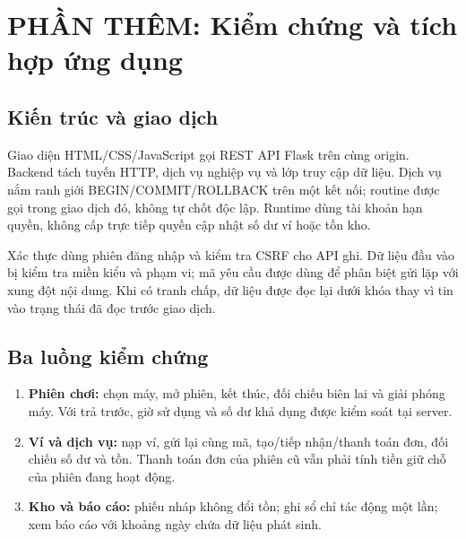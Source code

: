 \chapter{PHẦN THÊM: Kiểm chứng và tích hợp ứng dụng}\label{chap:verification}
\section{Kiến trúc và giao dịch}
Giao diện HTML/CSS/JavaScript gọi REST API Flask trên cùng origin. Backend tách tuyến HTTP, dịch vụ nghiệp vụ và lớp truy cập dữ liệu. Dịch vụ nắm ranh giới BEGIN/COMMIT/ROLLBACK trên một kết nối; routine được gọi trong giao dịch đó, không tự chốt độc lập. Runtime dùng tài khoản hạn quyền, không cấp trực tiếp quyền cập nhật số dư ví hoặc tồn kho.


Xác thực dùng phiên đăng nhập và kiểm tra CSRF cho API ghi. Dữ liệu đầu vào bị kiểm tra miền kiểu và phạm vi; mã yêu cầu được dùng để phân biệt gửi lặp với xung đột nội dung. Khi có tranh chấp, dữ liệu được đọc lại dưới khóa thay vì tin vào trạng thái đã đọc trước giao dịch.
\section{Ba luồng kiểm chứng}
\begin{enumerate}
\item \textbf{Phiên chơi:} chọn máy, mở phiên, kết thúc, đối chiếu biên lai và giải phóng máy. Với trả trước, giờ sử dụng và số dư khả dụng được kiểm soát tại server.
\item \textbf{Ví và dịch vụ:} nạp ví, gửi lại cùng mã, tạo/tiếp nhận/thanh toán đơn, đối chiếu số dư và tồn. Thanh toán đơn của phiên cũ vẫn phải tính tiền giữ chỗ của phiên đang hoạt động.
\item \textbf{Kho và báo cáo:} phiếu nháp không đổi tồn; ghi sổ chỉ tác động một lần; xem báo cáo với khoảng ngày chứa dữ liệu phát sinh.
\end{enumerate}
